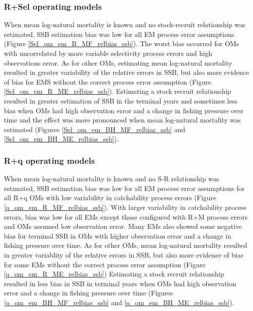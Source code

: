 \documentclass[
  12pt,
]{article}
\begin{document}
\hypertarget{rsel-operating-models-3}{%
\subsubsection*{R+Sel operating models}\label{rsel-operating-models-3}}

When mean log-natural mortality is known and no stock-recruit
relationship was estimated, SSB estimation bias was low for all EM
process error assumptions (Figure \ref{Sel_om_em_R_MF_relbias_ssb}). The
worst bias occurred for OMs with uncorrelated by more variable
selectivity process errors and high observations error. As for other
OMs, estimating mean log-natural mortality resulted in greater
variability of the relative errors in SSB, but also more evidence of
bias for EMS without the correct process error assumption (Figure
\ref{Sel_om_em_R_ME_relbias_ssb}). Estimating a stock recruit
relationship resulted in greater estimation of SSB in the terminal years
and sometimes less bias when OMs had high observation error and a change
in fishing pressure over time and the effect was more pronounced when
mean log-natural mortality was estimated (Figures
\ref{Sel_om_em_BH_MF_relbias_ssb} and
\ref{Sel_om_em_BH_ME_relbias_ssb}).

\hypertarget{rq-operating-models-3}{%
\subsubsection*{R+q operating models}\label{rq-operating-models-3}}

When mean log-natural mortality is known and no S-R relationship was
estimated, SSB estimation bias was low for all EM process error
assumptions for all R+q OMs with low variability in catchability process
errors (Figure \ref{q_om_em_R_MF_relbias_ssb}). With larger variability
in catchability process errors, bias was low for all EMs except those
configured with R+M process errors and OMs assumed low observation
error. Many EMs also showed some negative bias for terminal SSB in OMs
with higher observation error and a change in fishing pressure over
time. As for other OMs, mean log-natural mortality resulted in greater
variablity of the relative errors in SSB, but also more evidence of bias
for some EMs without the correct process error assumption (Figure
\ref{q_om_em_R_ME_relbias_ssb}) Estimating a stock recruit relationship
resulted in less bias in SSB in terminal years when OMs had high
observation error and a change in fishing pressure over time (Figures
\ref{q_om_em_BH_MF_relbias_ssb} and \ref{q_om_em_BH_ME_relbias_ssb}).
\end{document}
